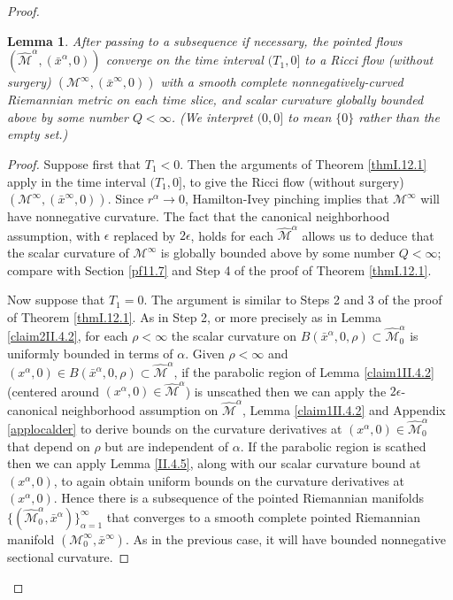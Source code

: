 \documentclass[12pt]{amsart}
\newcommand{\al}{\alpha}
\newcommand{\M}{{\mathcal M}}
\numberwithin{equation}{section}
\theoremstyle{plain}
\newtheorem{lemma}[equation]{Lemma}
\theoremstyle{definition}
\theoremstyle{remark}
\begin{document}
\begin{proof}
\begin{lemma} \label{bdrysmoothness}
After passing to a subsequence
if necessary, the pointed flows  $(\widehat\M^\al,(\bar x^\al,0))$
converge on the time interval $(T_1, 0]$ to a Ricci flow (without 
surgery) $(\M^\infty,(\bar x^\infty,0))$ with 
a smooth complete nonnegatively-curved Riemannian metric
on each time slice, and 
scalar curvature globally bounded above by 
some number $Q<\infty$. 
(We interpret $(0, 0]$ to mean $\{0\}$ rather than the 
empty set.) 
\end{lemma}
\begin{proof}
Suppose first that $T_1 < 0$.
Then the arguments of Theorem \ref{thmI.12.1} apply in the 
time interval $(T_1, 0]$, to give the Ricci flow (without 
surgery) $(\M^\infty,(\bar x^\infty,0))$. 
Since $r^{\al} \rightarrow 0$, Hamilton-Ivey pinching
implies that $\M^\infty$ will have nonnegative curvature.
The fact that the 
canonical neighborhood assumption, 
with $\epsilon$ replaced by $2 \epsilon$,
holds for each $\widehat\M^\al$ allows us
to deduce
that the scalar curvature of $\M^\infty$ is globally bounded above by 
some number $Q<\infty$; compare with Section \ref{pf11.7}
and Step 4 of the proof of Theorem \ref{thmI.12.1}.

Now suppose that $T_1 = 0$.
The argument is similar to Steps 2 and 3 of the proof of Theorem
\ref{thmI.12.1}. 
As in Step 2,
or more precisely as in  Lemma \ref{claim2II.4.2}, 
for each $\rho < \infty$ 
the scalar curvature on
$B(\bar x^\al, 0, \rho) \subset \widehat\M^{\al}_0$ 
is uniformly bounded in terms of $\al$.
Given $\rho < \infty$ and 
$(x^\al,0) \in B(\bar x^\al, 0, \rho) \subset \widehat\M^\al$,
if the parabolic region of
Lemma \ref{claim1II.4.2} (centered around
$(x^\al, 0) \in \widehat\M^\al$) is unscathed then we can
apply 
the $2 \epsilon$-canonical neighborhood assumption
on $\widehat\M^\al$, Lemma \ref{claim1II.4.2} and Appendix \ref{applocalder}
to derive bounds on the curvature derivatives at 
$(x^\al,0) \in \widehat\M^\al_0$
that depend on $\rho$ but are independent of $\al$.
If the parabolic region is scathed then we can apply Lemma
\ref{II.4.5}, along with our scalar curvature bound at 
$(x^\al,0)$,
to again obtain uniform bounds on the curvature derivatives at 
$(x^\al,0)$.
Hence there is a subsequence of
the pointed Riemannian manifolds 
$\{(\widehat\M^\al_0, \bar x^\al)\}_{\al = 1}^\infty$ 
that converges to a smooth complete pointed
Riemannian manifold $(\M^\infty_0, \bar x^\infty)$. 
As in the previous case, it will have 
bounded nonnegative sectional curvature.


\end{proof}
\end{proof}
\end{document}
